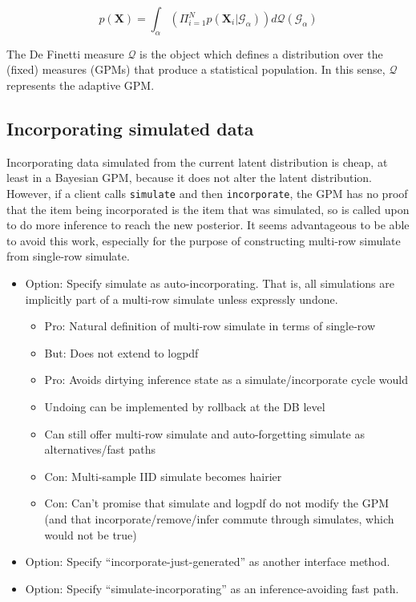 \documentclass[10pt,letterpaper]{article}
\newcommand{\G}{\mathcal{G}}
\begin{document}
$$p(\mathbf{X}) = \int_\alpha{(\Pi_{i=1}^Np(\mathbf{X}_i|\G_\alpha))d
\mathcal{Q}(\G_\alpha)}$$

The De Finetti measure $\mathcal{Q}$ is the object which defines a distribution
over the (fixed) measures (GPMs) that produce a statistical population. In this
sense, $\mathcal{Q}$ represents the adaptive GPM.

\subsection{Incorporating simulated data}

Incorporating data simulated from the current latent distribution is
cheap, at least in a Bayesian GPM, because it does not alter the
latent distribution.  However, if a client calls \texttt{simulate} and
then \texttt{incorporate}, the GPM has no proof that the item being
incorporated is the item that was simulated, so is called upon to do
more inference to reach the new posterior.  It seems advantageous to
be able to avoid this work, especially for the purpose of constructing
multi-row simulate from single-row simulate.

\begin{itemize}
\item Option: Specify simulate as auto-incorporating.  That is,
all simulations are implicitly part of a multi-row simulate unless
expressly undone.
\begin{itemize}
\item Pro: Natural definition of multi-row simulate in terms of single-row
\item But: Does not extend to logpdf
\item Pro: Avoids dirtying inference state as a simulate/incorporate cycle
  would
\item Undoing can be implemented by rollback at the DB level
\item Can still offer multi-row simulate and auto-forgetting simulate as
  alternatives/fast paths
\item Con: Multi-sample IID simulate becomes hairier
\item Con: Can't promise that simulate and logpdf do not modify the GPM
  (and that incorporate/remove/infer commute through simulates, which
  would not be true)
\end{itemize}
\item Option: Specify ``incorporate-just-generated'' as another
  interface method.
\item Option: Specify ``simulate-incorporating'' as an
  inference-avoiding fast path.
\end{itemize}
\end{document}
